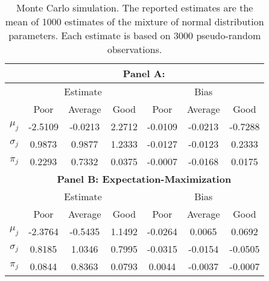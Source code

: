 		\begin{table}[t]
			\centering
			\small
			\begin{tabular}{*{7}{c}}
			    \toprule
			    & \multicolumn{6}{c}{\textbf{Panel A: \citet{Barras2010}}} \\
			    \midrule
			    & \multicolumn{3}{c}{Estimate} & \multicolumn{3}{c}{Bias} \\
			    \cmidrule(l{2pt}r{2pt}){2-4} \cmidrule(l{2pt}r{2pt}){5-7}
			    & Poor & Average & Good & Poor & Average & Good \\
			    \midrule
			    $\mu_j$ & -2.5109 & -0.0213 & 2.2712 & -0.0109 & -0.0213 & -0.7288 \\
			    $\sigma_j$ & 0.9873 & 0.9877 & 1.2333 & -0.0127 & -0.0123 & 0.2333 \\
			    $\pi_j$ & 0.2293 & 0.7332 & 0.0375 & -0.0007 & -0.0168 & 0.0175 \\
			    \midrule
			    & \multicolumn{6}{c}{\textbf{Panel B: Expectation-Maximization}} \\
			    \midrule
			    & \multicolumn{3}{c}{Estimate} & \multicolumn{3}{c}{Bias} \\
			    \cmidrule(l{2pt}r{2pt}){2-4} \cmidrule(l{2pt}r{2pt}){5-7}
			    & Poor & Average & Good & Poor & Average & Good \\
			    \midrule
			    $\mu_j$ & -2.3764 & -0.5435 & 1.1492 & -0.0264 & 0.0065 & 0.0692 \\
			    $\sigma_j$ & 0.8185 & 1.0346 & 0.7995 & -0.0315 & -0.0154 & -0.0505 \\
			    $\pi_j$ & 0.0844 & 0.8363 & 0.0793 & 0.0044 & -0.0037 & -0.0007 \\
			    \bottomrule
			    \end{tabular}
			\captionsetup{position=below, font=footnotesize, justification=justified, width=0.71\linewidth}
			\caption[Monte Carlo simulation]{Monte Carlo simulation. The reported estimates are the mean of 1000 estimates of the mixture of normal distribution parameters.  Each estimate is based on 3000 pseudo-random observations.}
			\label{tab:simulation}
		\end{table}


